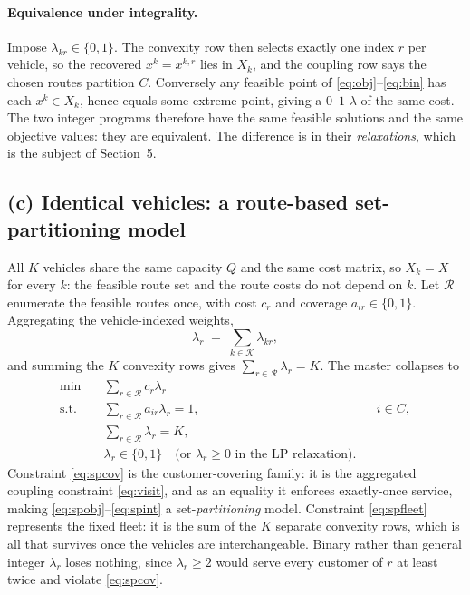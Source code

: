 \documentclass[11pt]{article}
\DeclareMathOperator*{\minimize}{min}
\begin{document}
\paragraph{Equivalence under integrality.} Impose
$\lambda_{kr} \in \{0,1\}$. The convexity row then selects exactly one
index $r$ per vehicle, so the recovered $x^k = x^{k,r}$ lies in $X_k$,
and the coupling row says the chosen routes partition $C$. Conversely
any feasible point of \eqref{eq:obj}--\eqref{eq:bin} has each $x^k \in
X_k$, hence equals some extreme point, giving a $0$--$1$ $\lambda$ of
the same cost. The two integer programs therefore have the same
feasible solutions and the same objective values: they are equivalent.
The difference is in their \emph{relaxations}, which is the subject of
Section~5.

\subsection{(c) Identical vehicles: a route-based set-partitioning model}

All $K$ vehicles share the same capacity $Q$ and the same cost matrix,
so $X_k = X$ for every $k$: the feasible route set and the route costs
do not depend on $k$. Let $\mathcal{R}$ enumerate the feasible routes
once, with cost $c_r$ and coverage $a_{ir} \in \{0,1\}$. Aggregating
the vehicle-indexed weights,
\[
  \lambda_r \;=\; \sum_{k \in \mathcal{K}} \lambda_{kr},
\]
and summing the $K$ convexity rows gives
$\sum_{r \in \mathcal{R}} \lambda_r = K$. The master collapses to
\begin{align}
  \minimize \quad & \sum_{r \in \mathcal{R}} c_r \lambda_r
    \label{eq:spobj}\\
  \text{s.t.}\quad
  & \sum_{r \in \mathcal{R}} a_{ir} \lambda_r = 1, && i \in C,
    \label{eq:spcov}\\
  & \sum_{r \in \mathcal{R}} \lambda_r = K, \label{eq:spfleet}\\
  & \lambda_r \in \{0,1\} \quad\text{(or } \lambda_r \ge 0
    \text{ in the LP relaxation)}. \label{eq:spint}
\end{align}
Constraint \eqref{eq:spcov} is the customer-covering family: it is the
aggregated coupling constraint \eqref{eq:visit}, and as an equality it
enforces exactly-once service, making \eqref{eq:spobj}--\eqref{eq:spint}
a set-\emph{partitioning} model. Constraint \eqref{eq:spfleet}
represents the fixed fleet: it is the sum of the $K$ separate convexity
rows, which is all that survives once the vehicles are interchangeable.
Binary rather than general integer $\lambda_r$ loses nothing, since
$\lambda_r \ge 2$ would serve every customer of $r$ at least twice and
violate \eqref{eq:spcov}.
\end{document}
